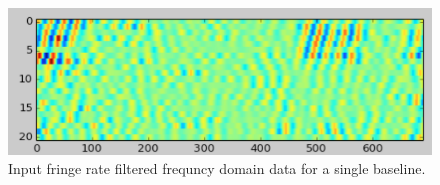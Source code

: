 \documentclass[twocolumn,numberedappendix]{emulateapj}
\begin{document}
%
%
%
%
%
%
%
%
%

\begin{figure}[h!]\centering
\includegraphics[width=2\columnwidth, height=.8\columnwidth]{plots/x_example.png}
\caption{Input fringe rate filtered frequncy domain data for a single baseline.}
\label{fig:x_example}
\end{figure}
\end{document}
